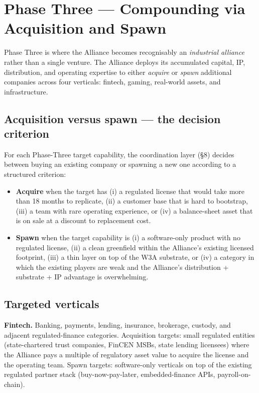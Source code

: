 \section{Phase Three --- Compounding via Acquisition and Spawn}

Phase Three is where the Alliance becomes recognisably an
\emph{industrial alliance} rather than a single venture. The Alliance
deploys its accumulated capital, IP, distribution, and operating
expertise to either \emph{acquire} or \emph{spawn} additional companies
across four verticals: fintech, gaming, real-world assets, and
infrastructure.

\subsection{Acquisition versus spawn --- the decision criterion}

For each Phase-Three target capability, the coordination layer (\S 8)
decides between buying an existing company or spawning a new one
according to a structured criterion:

\begin{itemize}[leftmargin=2em,itemsep=0.1em]
\item \textbf{Acquire} when the target has (i) a regulated license that
would take more than 18 months to replicate, (ii) a customer base that
is hard to bootstrap, (iii) a team with rare operating experience, or
(iv) a balance-sheet asset that is on sale at a discount to replacement
cost.
\item \textbf{Spawn} when the target capability is (i) a software-only
product with no regulated license, (ii) a clean greenfield within the
Alliance's existing licensed footprint, (iii) a thin layer on top of
the W3A substrate, or (iv) a category in which the existing players are
weak and the Alliance's distribution + substrate + IP advantage is
overwhelming.
\end{itemize}

\subsection{Targeted verticals}

\textbf{Fintech.} Banking, payments, lending, insurance, brokerage,
custody, and adjacent regulated-finance categories. Acquisition targets:
small regulated entities (state-chartered trust companies, FinCEN MSBs,
state lending licensees) where the Alliance pays a multiple of regulatory
asset value to acquire the license and the operating team. Spawn targets:
software-only verticals on top of the existing regulated partner stack
(buy-now-pay-later, embedded-finance APIs, payroll-on-chain).

